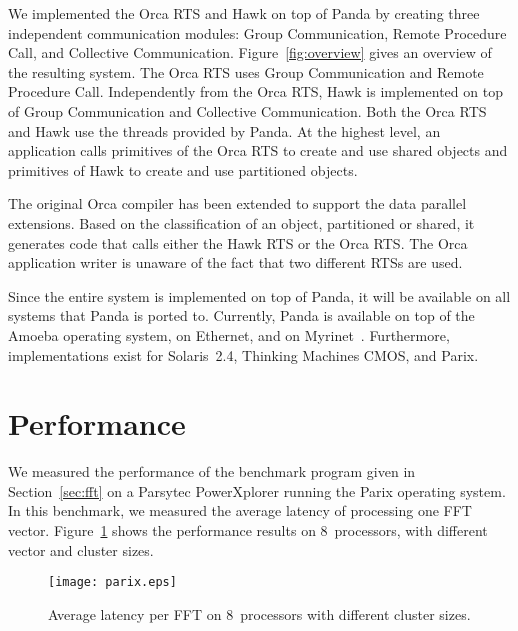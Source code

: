 \documentclass{article}
\begin{document}
\begin{figure*}[htbp]
  \begin{center}
    \leavevmode
    
    \caption{{\small \sf System overview.}}
    \label{fig:overview}
  \end{center}
\end{figure*}

We implemented the Orca RTS and Hawk on top of Panda by creating three
independent communication modules: Group Communication, Remote
Procedure Call, and Collective Communication.
Figure~\ref{fig:overview} gives an overview of the resulting system.
The Orca RTS uses Group Communication and Remote Procedure Call.
Independently from the Orca RTS, Hawk is implemented on top of Group
Communication and Collective Communication. Both the Orca RTS and Hawk
use the threads provided by Panda. At the highest level, an
application calls primitives of the Orca RTS to create and use shared
objects and primitives of Hawk to create and use partitioned objects.

The original Orca compiler has been extended to support the data
parallel extensions. Based on the classification of an object,
partitioned or shared, it generates code that calls either the Hawk
RTS or the Orca RTS. The Orca application writer is unaware of the
fact that two different RTSs are used.

Since the entire system is implemented on top of Panda, it will be
available on all systems that Panda is ported to. Currently, Panda is
available on top of the Amoeba operating system, on Ethernet, and on
Myrinet~\cite{Boden95-myrinet}. Furthermore, implementations exist for
Solaris~2.4, Thinking Machines CMOS, and Parix.

\section{Performance}
\label{sec:performance}

We measured the performance of the benchmark program given in
Section~\ref{sec:fft} on a Parsytec PowerXplorer running the Parix
operating system. In this benchmark, we measured the average latency
of processing one FFT vector. Figure~\ref{fig:parix} shows the
performance results on 8~processors, with different vector and cluster
sizes.

\begin{figure}
  \begin{center}
  \texttt{[image: parix.eps]}
  \end{center}
  \caption{\label{fig:parix} {\small \sf Average latency per FFT on
      8~processors with different cluster sizes.}}
\end{figure}
\end{document}
